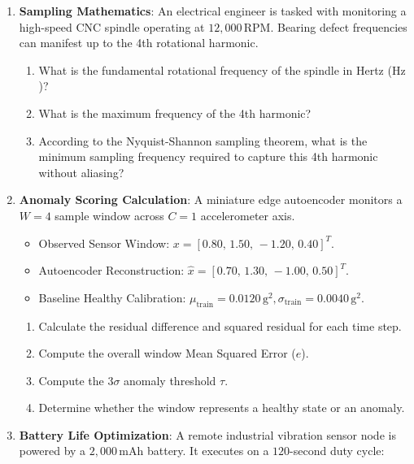 \begin{checkyourself}
\begin{enumerate}
    \item \textbf{Sampling Mathematics}: An electrical engineer is tasked with monitoring a high-speed CNC spindle operating at $12{,}000\,\text{RPM}$. Bearing defect frequencies can manifest up to the 4th rotational harmonic.
    \begin{enumerate}
        \item What is the fundamental rotational frequency of the spindle in Hertz ($\text{Hz}$)?
        \item What is the maximum frequency of the 4th harmonic?
        \item According to the Nyquist-Shannon sampling theorem, what is the minimum sampling frequency required to capture this 4th harmonic without aliasing?
    \end{enumerate}
    \item \textbf{Anomaly Scoring Calculation}: A miniature edge autoencoder monitors a $W = 4$ sample window across $C = 1$ accelerometer axis. 
    \begin{itemize}
        \item Observed Sensor Window: $x = [0.80,\, 1.50,\, -1.20,\, 0.40]^T$.
        \item Autoencoder Reconstruction: $\hat{x} = [0.70,\, 1.30,\, -1.00,\, 0.50]^T$.
        \item Baseline Healthy Calibration: $\mu_{\text{train}} = 0.0120\,\text{g}^2, \sigma_{\text{train}} = 0.0040\,\text{g}^2$.
    \end{itemize}
    \begin{enumerate}
        \item Calculate the residual difference and squared residual for each time step.
        \item Compute the overall window Mean Squared Error ($e$).
        \item Compute the $3\sigma$ anomaly threshold $\tau$.
        \item Determine whether the window represents a healthy state or an anomaly.
    \end{enumerate}
    \item \textbf{Battery Life Optimization}: A remote industrial vibration sensor node is powered by a $2{,}000\,\text{mAh}$ battery. It executes on a $120$-second duty cycle:

\end{enumerate}
\end{checkyourself}
